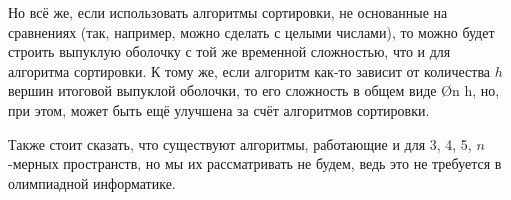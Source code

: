 Но всё же, если использовать алгоритмы сортировки, не основанные на сравнениях (так, например, можно сделать с целыми числами), то можно будет строить выпуклую оболочку с той же временной сложностью, что и для алгоритма сортировки. К тому же, если алгоритм как-то зависит от количества $h$ вершин итоговой выпуклой оболочки, то его сложность в общем виде \O{n \log h}, но, при этом, может быть ещё улучшена за счёт алгоритмов сортировки.

Также стоит сказать, что существуют алгоритмы, работающие и для 3, 4, 5, $n$-мерных пространств, но мы их рассматривать не будем, ведь это не требуется в олимпиадной информатике.

